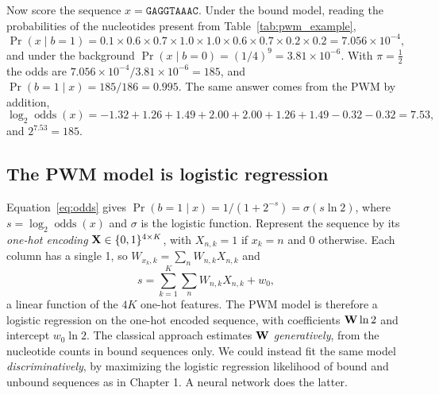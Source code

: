 \begin{table}[t]
  \centering
  \caption{Position frequency, probability and weight matrices (background $q_n=\frac14$, no pseudocount) for the ten toy bound sequences in the text, after the example in Wikipedia's ``Position weight matrix'' article.}
  \label{tab:pwm_example}
  \small
  
\end{table}

Now score the sequence $x=\texttt{GAGGTAAAC}$. Under the bound model, reading the probabilities of the nucleotides present from Table~\ref{tab:pwm_example},
\begin{equation}
  \Pr(x\mid b=1) = 0.1\times0.6\times0.7\times1.0\times1.0\times0.6\times0.7\times0.2\times0.2 = 7.056\times10^{-4},
\end{equation}
and under the background $\Pr(x\mid b=0)=(1/4)^9=3.81\times10^{-6}$. With $\pi=\frac12$ the odds are $7.056\times10^{-4}/3.81\times10^{-6}=185$, and $\Pr(b=1\mid x)=185/186=0.995$. The same answer comes from the PWM by addition,
\begin{equation}
  \log_2\operatorname{odds}(x) = -1.32+1.26+1.49+2.00+2.00+1.26+1.49-0.32-0.32 = 7.53,
\end{equation}
and $2^{7.53}=185$.

\subsection{The PWM model is logistic regression}

Equation~\eqref{eq:odds} gives $\Pr(b=1\mid x)=1/(1+2^{-s})=\sigma(s\ln 2)$, where $s=\log_2\operatorname{odds}(x)$ and $\sigma$ is the logistic function. Represent the sequence by its \emph{one-hot encoding} $\mathbf{X}\in\{0,1\}^{4\times K}$, with $X_{n,k}=1$ if $x_k=n$ and 0 otherwise. Each column has a single 1, so $W_{x_k,k}=\sum_nW_{n,k}X_{n,k}$ and
\begin{equation}
  s = \sum_{k=1}^K\sum_{n}W_{n,k}X_{n,k} + w_0 ,
  \label{eq:pwm_linear}
\end{equation}
a linear function of the $4K$ one-hot features. The PWM model is therefore a logistic regression on the one-hot encoded sequence, with coefficients $\mathbf{W}\ln 2$ and intercept $w_0\ln 2$. The classical approach estimates $\mathbf{W}$ \emph{generatively}, from the nucleotide counts in bound sequences only. We could instead fit the same model \emph{discriminatively}, by maximizing the logistic regression likelihood of bound and unbound sequences as in Chapter 1. A neural network does the latter.

